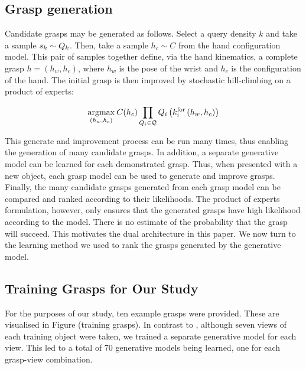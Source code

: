 \subsection{Grasp generation}
Candidate grasps may be generated as follows. Select a query density $k$ and take a sample  $s_k \sim Q_{k}$. Then, take a sample $h_c \sim C$ from the hand configuration model. This pair of samples together define, via the hand kinematics, a complete grasp $h=(h_w,h_c)$, where $h_w$ is the pose of the wrist and $h_c$ is the configuration of the hand. The initial grasp is then improved by stochastic hill-climbing on a product of experts:

\begin{equation}
\argmax{(h_w, h_c)} \hc(h_c) \prod_{\qd_i \in \mathcal{Q}} \qd_i\left(k_{i}^{\mathrm{for}}\left(h_w, h_c\right)\right)
\label{eq:grasping.product}
\end{equation}

This generate and improvement process can be run many times, thus enabling the generation of many candidate grasps. In addition, a separate generative model can be learned for each demonstrated grasp. Thus, when presented with a new object, each grasp model can be used to generate and improve grasps. Finally, the many candidate grasps generated from each grasp model can be compared and ranked according to their likelihoods. The product of experts formulation, however, only ensures that the generated grasps have high likelihood according to the model. There is no estimate of the probability that the grasp will succeed. This motivates the dual architecture in this paper. We now turn to the learning method we used to rank the grasps generated by the generative model. 

\subsection{Training Grasps for Our Study}

For the purposes of our study, ten example grasps were provided. These are visualised in Figure (training grasps). In contrast to \cite{kopicki2015ijrr}, although seven views of each training object were taken, we trained a separate generative model for each view. This led to a total of 70 generative models being learned, one for each grasp-view combination. 

